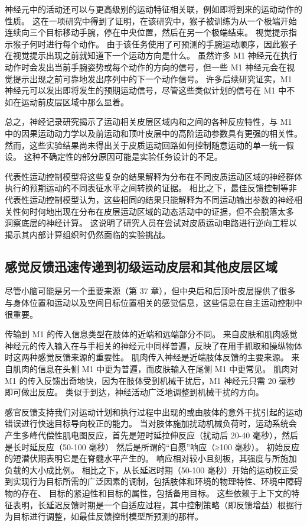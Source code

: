 神经元中的活动还可以与更高级别的运动特征相关联，例如即将到来的运动动作的性质。 这在一项研究中得到了证明，在该研究中，猴子被训练为从一个极端开始连续向三个目标移动手腕，停在中央位置，然后在另一个极端结束。 视觉提示指示猴子何时进行每个动作。 由于该任务使用了可预测的手腕运动顺序，因此猴子在视觉提示出现之前就知道下一个运动方向是什么。 虽然许多 M1 神经元在执行动作时会发出当前手腕姿势或每个动作的方向的信号，但一些 M1 神经元会在视觉提示出现之前可靠地发出序列中的下一个动作信号。 许多后续研究证实，M1 神经元可以发出即将发生的预期运动信号，尽管这些类似计划的信号在 M1 中不如在运动前皮层区域中那么显着。

总之，神经记录研究揭示了运动相关皮层区域内和之间的各种反应特性，与 M1 中的因果运动动力学以及前运动和顶叶皮层中的高阶运动参数具有更强的相关性。 然而，这些实验结果尚未得出关于皮质运动回路如何控制随意运动的单一统一假设。 这种不确定性的部分原因可能是实验任务设计的不足。

代表性运动控制模型将这些复杂的结果解释为分布在不同皮质运动区域的神经群体执行的预期运动的不同表征水平之间转换的证据。 相比之下，最佳反馈控制等非代表性运动控制模型认为，这些相同的结果只能解释为不同运动输出参数的神经相关性何时何地出现在分布在皮层运动区域的动态活动中的证据，但不会脱落太多 洞察底层的神经计算。 这说明了研究人员在尝试对皮质运动电路进行逆向工程以揭示其内部计算组织时仍然面临的实验挑战。

\subsection{感觉反馈迅速传递到初级运动皮层和其他皮层区域}
尽管小脑可能是另一个重要来源（第 37 章），但中央后和后顶叶皮层提供了很多与身体位置和运动以及空间目标位置相关的感觉信息，这些信息在自主运动控制中很重要。

传输到 M1 的传入信息类型在肢体的近端和远端部分不同。 来自皮肤和肌肉感觉神经元的传入输入在与手相关的神经元中同样普遍，反映了在用手抓取和操纵物体时这两种感觉反馈来源的重要性。 肌肉传入神经是近端肢体反馈的主要来源。 来自肌肉的信息在头侧 M1 中更为普遍，而皮肤输入在尾侧 M1 中更常见。 肌肉对 M1 的传入反馈出奇地快，因为在肢体受到机械干扰后，M1 神经元只需 20 毫秒即可做出反应。 类似于到达，神经活动广泛地调整到机械干扰的方向。

感官反馈支持我们对运动计划和执行过程中出现的或由肢体的意外干扰引起的运动错误进行快速目标导向校正的能力。 当对肢体施加扰动机械负荷时，运动系统会产生多峰代偿性肌电图反应，首先是短时延拉伸反应（扰动后 20-40 毫秒），然后是长时延反应（50-100 毫秒） 然后是所谓的“自愿”响应（≥100 毫秒）。 初始反应的短潜伏期表明它是在脊髓水平产生的。 响应相对较小且刻板，其强度与所施加负载的大小成比例。 相比之下，从长延迟时期（50-100 毫秒）开始的运动校正受到实现行为目标所需的广泛因素的调制，包括肢体和环境的物理特性、环境中障碍物的存在、 目标的紧迫性和目标的属性，包括备用目标。 这些依赖于上下文的特征表明，长延迟反馈时期是一个自适应过程，其中控制策略（即反馈增益）根据行为目标进行调整，如最佳反馈控制模型所预测的那样。

